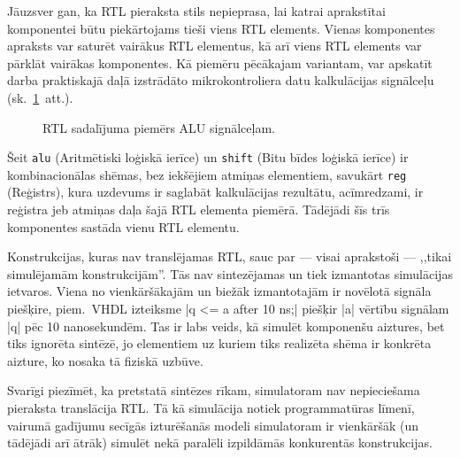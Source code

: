 Jāuzsver gan, ka RTL pieraksta stils nepieprasa, lai katrai aprakstītai
komponentei būtu piekārtojams tieši viens RTL elements. Vienas komponentes
apraksts var saturēt vairākus RTL elementus, kā arī viens RTL elements var
pārklāt vairākas komponentes. Kā piemēru pēcākajam variantam, var apskatīt
darba praktiskajā daļā izstrādāto mikrokontroliera datu kalkulācijas
signālceļu (sk.~\ref{fig:rtl-alu}~att.).
\begin{figure}[thb]
	\centering
	\def\svgwidth{0.9\textwidth}
	{\ttfamily\scriptsize}
	\caption{RTL sadalījuma piemērs ALU signālceļam.}
	\label{fig:rtl-alu}
\end{figure}
Šeit \texttt{alu} (Aritmētiski loģiskā ierīce) un \texttt{shift}
(Bitu bīdes loģiskā ierīce) ir kombinacionālas shēmas, bez iekšējiem atmiņas
elementiem, savukārt \texttt{reg} (Reģistrs), kura uzdevums ir saglabāt kalkulācijas
rezultātu, acīmredzami, ir reģistra jeb atmiņas daļa šajā RTL elementa piemērā.
Tādējādi šīs trīs komponentes sastāda vienu RTL elementu.

Konstrukcijas, kuras nav translējamas RTL, sauc par --- visai aprakstoši ---
,,tikai simulējamām konstrukcijām''. Tās nav sintezējamas un tiek
izmantotas simulācijas ietvaros. Viena no vienkāršākajām un biežāk
izmantotajām ir novēlotā signāla piešķire, piem.~VHDL izteiksme 
|q <= a after 10 ns;| piešķir |a| vērtību signālam |q| pēc 10 nanosekundēm.
Tas ir labs veids, kā simulēt komponenšu aiztures, bet tiks ignorēta
sintēzē, jo elementiem uz kuriem tiks realizēta shēma ir konkrēta aizture,
ko nosaka tā fiziskā uzbūve.

Svarīgi piezīmēt, ka pretstatā sintēzes rīkam, simulatoram nav nepieciešama
pieraksta translācija RTL. Tā kā simulācija notiek
programmatūras līmenī, vairumā gadījumu secīgās izturēšanās modeli
simulatoram ir vienkāršāk (un tādējādi arī ātrāk) simulēt nekā paralēli
izpildāmās konkurentās konstrukcijas.

